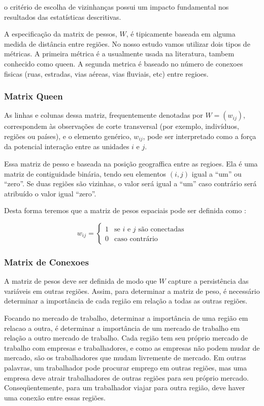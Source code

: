 \documentclass[]{article}
\begin{document}
o critério de escolha de vizinhanças possui um impacto fundamental nos
resultados das estatísticas descritivas.

A especificação da matrix de pessos, \(W\), é tipicamente baseada em
alguma medida de distância entre regiões. No nosso estudo vamos utilizar
dois tipos de métricas. A primeira métrica é a usualmente usada na
literatura, tambem conhecido como queen. A segunda metrica é baseado no
número de conexoes fisicas (ruas, estradas, vias aéreas, vias fluviais,
etc) entre regioes.

\subsubsection{Matrix Queen}\label{matrix-queen}

As linhas e colunas dessa matriz, frequentemente denotadas por
\(W = (w_{ij})\), correspondem às observações de corte transversal (por
exemplo, indivíduos, regiões ou países), e o elemento genérico,
\(w_{ij}\), pode ser interpretado como a força da potencial interação
entre as unidades \(i\) e \(j\).

Essa matriz de pesso e baseada na posição geograffica entre as regioes.
Ela é uma matriz de contiguidade binária, tendo seu elementos \((i, j)\)
igual a ``um'' ou ``zero''. Se duas regiões são vizinhas, o valor será
igual a ``um'' caso contrário será atribuído o valor igual ``zero''.

Desta forma teremos que a matriz de pesos espaciais pode ser definida
como :

\[w_{ij} = \begin{cases} 1 & \text{se } i \text{ e } j \text{ são conectadas} \\ 0 & \text{caso contrário} \end{cases}\]

\subsubsection{Matrix de Conexoes}\label{matrix-de-conexoes}

A matriz de pesos deve ser definida de modo que \(W\) capture a
persistência das variáveis em outras regiões. Assim, para determinar a
matriz de peso, é necessário determinar a importância de cada região em
relação a todas as outras regiões.

Focando no mercado de trabalho, determinar a importância de uma região
em relacao a outra, é determinar a importância de um mercado de trabalho
em relação a outro mercado de trabalho. Cada região tem seu próprio
mercado de trabalho com empresas e trabalhadores, e como as empresas não
podem mudar de mercado, são os trabalhadores que mudam livremente de
mercado. Em outras palavras, um trabalhador pode procurar emprego em
outras regiões, mas uma empresa deve atrair trabalhadores de outras
regiões para seu próprio mercado. Conseqüentemente, para um trabalhador
viajar para outra região, deve haver uma conexão entre essas regiões.
\end{document}
